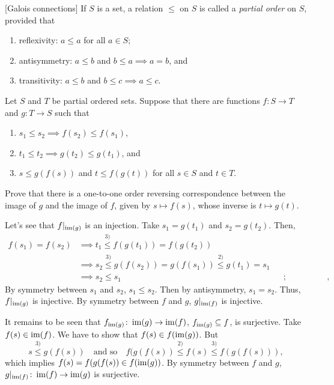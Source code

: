 \begin{probl} {\rm[Galois connections]}
    If\/ $S$ is a set, a relation\/ $\le$ on\/ $S$ is called a \textsl{partial order} on\/ $S$, provided that
    \begin{enumerate}[-]
        \item {\rm reflexivity: $a\le a$ for all\/ $a\in S$;}
        \item {\rm antisymmetry: $a\le b$ and\/ $b\le a \implies a = b$, and}
        \item {\rm transitivity: $a\le b$ and\/ $b\le c\implies a\le c$.}
    \end{enumerate} 
    Let\/ $S$ and\/ $T$ be partial ordered sets. Suppose that there are functions\/ $f\colon S\to T$ and\/ $g\colon T\to S$ such that
    \begin{enumerate}[\rm 1)]
        \item $s_1 \le s_2\implies f(s_2)\le f(s_1)$,
        \item {\rm$t_1\le t_2\implies g(t_2) \le g(t_1)$, and}
        \item {\rm$s\le g(f(s))$ and\/ $t\le f(g(t))$ for all\/ $s\in S$ and\/ $t\in T$.}
    \end{enumerate}
    Prove that there is a one-to-one order reversing correspondence between the image of\/ $g$ and the image of\/ $f$, given by\/ $s\mapsto f(s)$, whose inverse is\/ $t\mapsto g(t)$.
\end{probl}

\begin{solution}
    Let's see that $f|_{\operatorname{im}(g)}$ is an injection. Take $s_1=g(t_1)$ and $s_2=g(t_2)$. Then,
    \begin{align*}
        f(s_1)=f(s_2) &\implies t_1\stackrel{3)}{\le} f(g(t_1)) = f(g(t_2))\\
            &\implies s_2\stackrel{3)}{\le} g(f(s_2))
                =g(f(s_1))\stackrel{2)}{\le} g(t_1)=s_1\\
            &\implies s_2\le s_1
                &&\text{; transitivity},
    \end{align*}
    By symmetry between $s_1$ and $s_2$, $s_1\le s_2$. Then by antisymmetry, $s_1=s_2$. Thus, $f|_{\operatorname{im}(g)}$ is injective. By symmetry between $f$ and $g$, $g|_{\operatorname{im}(f)}$ is injective.

    It remains to be seen that $f_{\operatorname{im}(g)}\colon\operatorname{im}(g)\to\operatorname{im}(f)$, $f_{\operatorname{im}(g)}\subseteq f$, is surjective. Take $f(s)\in \operatorname{im}(f)$. We have to show that $f(s)\in f(\operatorname{im}(g))$. But
    $$
        s\stackrel{3)}{\le}g(f(s))\quad\text{and so}\quad
            f(g(f(s))\stackrel{2)}{\le}f(s)\stackrel{3)}{\le} f(g(f(s))),
    $$
    which implies $f(s)=f(g(f(s))\in f(\operatorname{im}(g))$. By symmetry between $f$ and $g$, $g|_{\operatorname{im}(f)}\colon\operatorname{im}(f)\to\operatorname{im}(g)$ is surjective.
\end{solution}

